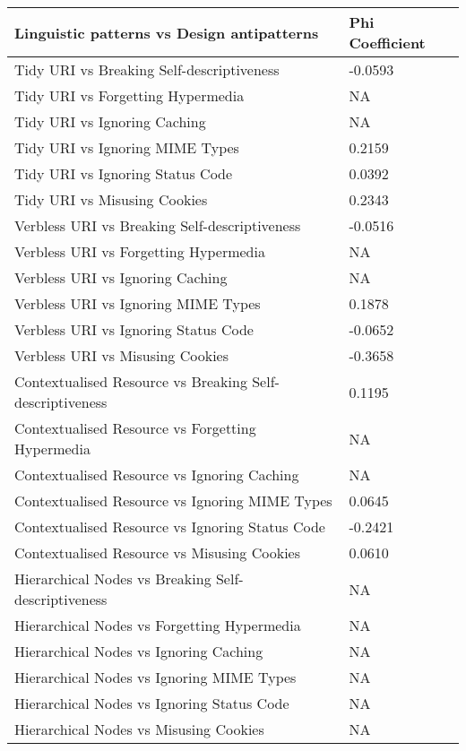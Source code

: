 \documentclass[a4paper,12pt]{article}
\begin{document}
\begin{table}[htb!]
    \centering
   \begin{tabular}{|p{90mm}|p{50mm}|}
\hline \textbf{Linguistic patterns vs Design antipatterns} & \textbf{Phi Coefficient} 
\\ \hline 
Tidy URI vs Breaking Self-descriptiveness & -0.0593
\\ \hline 
Tidy URI vs Forgetting Hypermedia & NA
\\ \hline 
Tidy URI vs Ignoring Caching & NA
\\ \hline 
Tidy URI vs Ignoring MIME Types & 0.2159
\\ \hline 
Tidy URI vs Ignoring Status Code & 0.0392
\\ \hline 
Tidy URI vs Misusing Cookies & 0.2343
\\ \hline 
Verbless URI vs Breaking Self-descriptiveness & -0.0516
\\ \hline 
Verbless URI vs Forgetting Hypermedia & NA
\\ \hline 
Verbless URI vs Ignoring Caching & NA
\\ \hline 
Verbless URI vs Ignoring MIME Types & 0.1878
\\ \hline 
Verbless URI vs Ignoring Status Code & -0.0652
\\ \hline 
Verbless URI vs Misusing Cookies & -0.3658
\\ \hline 
Contextualised Resource vs Breaking Self-descriptiveness & 0.1195
\\ \hline 
Contextualised Resource vs Forgetting Hypermedia & NA
\\ \hline 
Contextualised Resource vs Ignoring Caching & NA
\\ \hline 
Contextualised Resource vs Ignoring MIME Types & 0.0645
\\ \hline 
Contextualised Resource vs Ignoring Status Code & -0.2421
\\ \hline 
Contextualised Resource vs Misusing Cookies & 0.0610
\\ \hline 
Hierarchical Nodes vs Breaking Self-descriptiveness & NA
\\ \hline 
Hierarchical Nodes vs Forgetting Hypermedia & NA
\\ \hline 
Hierarchical Nodes vs Ignoring Caching & NA
\\ \hline 
Hierarchical Nodes vs Ignoring MIME Types & NA
\\ \hline 
Hierarchical Nodes vs Ignoring Status Code & NA
\\ \hline 
Hierarchical Nodes vs Misusing Cookies & NA

\end{tabular}
\end{table}
\end{document}
